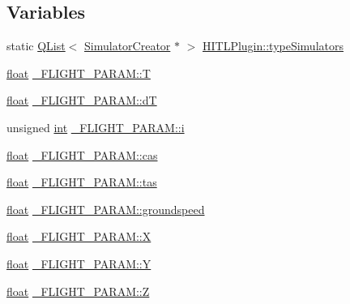 \subsection*{Variables}
\begin{DoxyCompactItemize}
\item 
static \hyperlink{class_q_list}{Q\-List}$<$ \hyperlink{class_simulator_creator}{Simulator\-Creator} $\ast$ $>$ \hyperlink{group___h_i_t_l_plugin_ga0400c2f74f4a0c3cd840f95c99b1b601}{H\-I\-T\-L\-Plugin\-::type\-Simulators}
\item 
\hyperlink{_super_l_u_support_8h_a6a1bb6ed41f44b60e7bd83b0e9945aa7}{float} \hyperlink{group___h_i_t_l_plugin_ga6c3abbd8306a5eb69384ca36f338991b}{\-\_\-\-F\-L\-I\-G\-H\-T\-\_\-\-P\-A\-R\-A\-M\-::\-T}
\item 
\hyperlink{_super_l_u_support_8h_a6a1bb6ed41f44b60e7bd83b0e9945aa7}{float} \hyperlink{group___h_i_t_l_plugin_gabba6faff155324d93353abc952708700}{\-\_\-\-F\-L\-I\-G\-H\-T\-\_\-\-P\-A\-R\-A\-M\-::d\-T}
\item 
unsigned \hyperlink{ioapi_8h_a787fa3cf048117ba7123753c1e74fcd6}{int} \hyperlink{group___h_i_t_l_plugin_gafd95bf6c88f8e93baff6c5e27a5508a4}{\-\_\-\-F\-L\-I\-G\-H\-T\-\_\-\-P\-A\-R\-A\-M\-::i}
\item 
\hyperlink{_super_l_u_support_8h_a6a1bb6ed41f44b60e7bd83b0e9945aa7}{float} \hyperlink{group___h_i_t_l_plugin_ga2fbe36224e421144a3822791ccd78c7b}{\-\_\-\-F\-L\-I\-G\-H\-T\-\_\-\-P\-A\-R\-A\-M\-::cas}
\item 
\hyperlink{_super_l_u_support_8h_a6a1bb6ed41f44b60e7bd83b0e9945aa7}{float} \hyperlink{group___h_i_t_l_plugin_gad3fafd24c05ec4da9b2b230dfe6eec23}{\-\_\-\-F\-L\-I\-G\-H\-T\-\_\-\-P\-A\-R\-A\-M\-::tas}
\item 
\hyperlink{_super_l_u_support_8h_a6a1bb6ed41f44b60e7bd83b0e9945aa7}{float} \hyperlink{group___h_i_t_l_plugin_ga2a4535a23a5ca83f655298d2494556d5}{\-\_\-\-F\-L\-I\-G\-H\-T\-\_\-\-P\-A\-R\-A\-M\-::groundspeed}
\item 
\hyperlink{_super_l_u_support_8h_a6a1bb6ed41f44b60e7bd83b0e9945aa7}{float} \hyperlink{group___h_i_t_l_plugin_ga55a42deedc5785d55c570ae908bcc46a}{\-\_\-\-F\-L\-I\-G\-H\-T\-\_\-\-P\-A\-R\-A\-M\-::\-X}
\item 
\hyperlink{_super_l_u_support_8h_a6a1bb6ed41f44b60e7bd83b0e9945aa7}{float} \hyperlink{group___h_i_t_l_plugin_gafb4f835313c27ac7b01fe3eb77b6bacc}{\-\_\-\-F\-L\-I\-G\-H\-T\-\_\-\-P\-A\-R\-A\-M\-::\-Y}
\item 
\hyperlink{_super_l_u_support_8h_a6a1bb6ed41f44b60e7bd83b0e9945aa7}{float} \hyperlink{group___h_i_t_l_plugin_gacb21381efc860b328d0be136ef53f98c}{\-\_\-\-F\-L\-I\-G\-H\-T\-\_\-\-P\-A\-R\-A\-M\-::\-Z}

\end{DoxyCompactItemize}
